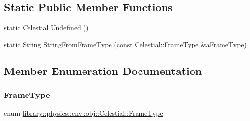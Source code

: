 \subsection*{Static Public Member Functions}
\begin{DoxyCompactItemize}
\item 
static \hyperlink{classlibrary_1_1physics_1_1env_1_1obj_1_1_celestial}{Celestial} \hyperlink{classlibrary_1_1physics_1_1env_1_1obj_1_1_celestial_a5e33230d05d77f5e1132151ecf5e94e9}{Undefined} ()
\item 
static String \hyperlink{classlibrary_1_1physics_1_1env_1_1obj_1_1_celestial_a020864aa551a1ec6f5674cc2e166b131}{String\+From\+Frame\+Type} (const \hyperlink{classlibrary_1_1physics_1_1env_1_1obj_1_1_celestial_a8585fb32125cb6c73ae1339a5ea09c79}{Celestial\+::\+Frame\+Type} \&a\+Frame\+Type)
\end{DoxyCompactItemize}


\subsection{Member Enumeration Documentation}
\mbox{\label{classlibrary_1_1physics_1_1env_1_1obj_1_1_celestial_a8585fb32125cb6c73ae1339a5ea09c79}} 
\subsubsection{\texorpdfstring{Frame\+Type}{FrameType}}
{\footnotesize\ttfamily enum \hyperlink{classlibrary_1_1physics_1_1env_1_1obj_1_1_celestial_a8585fb32125cb6c73ae1339a5ea09c79}{library\+::physics\+::env\+::obj\+::\+Celestial\+::\+Frame\+Type}\hspace{0.3cm}{\ttfamily [strong]}}

